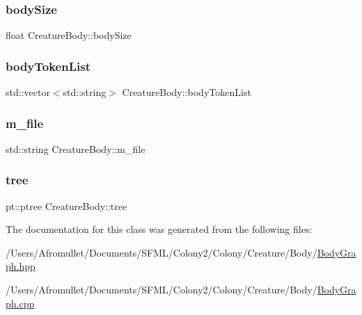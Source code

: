 \mbox{\label{class_creature_body_ae91bf63d2607dc4ee6e56fb1b7558fa4}} 
\subsubsection{\texorpdfstring{body\+Size}{bodySize}}
{\footnotesize\ttfamily float Creature\+Body\+::body\+Size\hspace{0.3cm}{\ttfamily [private]}}

\mbox{\label{class_creature_body_ad882f21d3166e49c5b8def87121bb9c0}} 
\subsubsection{\texorpdfstring{body\+Token\+List}{bodyTokenList}}
{\footnotesize\ttfamily std\+::vector$<$std\+::string$>$ Creature\+Body\+::body\+Token\+List\hspace{0.3cm}{\ttfamily [private]}}

\mbox{\label{class_creature_body_a7bb511e3d385b86c65613a627f33bd20}} 
\subsubsection{\texorpdfstring{m\+\_\+file}{m\_file}}
{\footnotesize\ttfamily std\+::string Creature\+Body\+::m\+\_\+file\hspace{0.3cm}{\ttfamily [private]}}

\mbox{\label{class_creature_body_aa7e0155e84f81f2fb5fda0696d17ab27}} 
\subsubsection{\texorpdfstring{tree}{tree}}
{\footnotesize\ttfamily pt\+::ptree Creature\+Body\+::tree\hspace{0.3cm}{\ttfamily [private]}}



The documentation for this class was generated from the following files\+:\begin{DoxyCompactItemize}
\item 
/\+Users/\+Afromullet/\+Documents/\+S\+F\+M\+L/\+Colony2/\+Colony/\+Creature/\+Body/\mbox{\hyperlink{_body_graph_8hpp}{Body\+Graph.\+hpp}}\item 
/\+Users/\+Afromullet/\+Documents/\+S\+F\+M\+L/\+Colony2/\+Colony/\+Creature/\+Body/\mbox{\hyperlink{_body_graph_8cpp}{Body\+Graph.\+cpp}}\end{DoxyCompactItemize}
